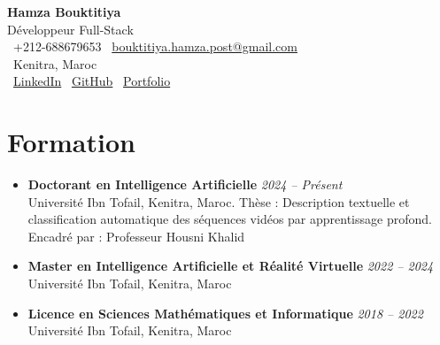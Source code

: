 \documentclass[10pt,a4paper]{article}
\newcommand{\cvheader}[4]{
    \begin{center}
        {\Huge\bfseries #1}\\[0.1em]
        {\large #2}\\[0.1em]
        \faPhone\ #3 \quad \faEnvelope\ \href{mailto:#4}{#4}\\[0.1em]
        \faMapMarker\ Kenitra, Maroc\\[0.1em]
        \faLinkedin\ \href{https://www.linkedin.com/in/hamza-bouktitiya-604471253/}{LinkedIn} \quad
        \faGithub\ \href{https://github.com/gothamza}{GitHub} \quad
        \faGlobe\ \href{https://gothamza.github.io/portfolio/}{Portfolio}
    \end{center}
    \vspace{-0.3em}
}
\newcommand{\cvitem}[2]{\textbf{#1} \hfill \textit{#2}}
\begin{document}
\cvheader{Hamza Bouktitiya}{Développeur Full-Stack}{+212-688679653}{bouktitiya.hamza.post@gmail.com}

\section*{Formation}
\begin{itemize}
    \item \cvitem{Doctorant en Intelligence Artificielle}{2024 -- Présent}\\
    Université Ibn Tofail, Kenitra, Maroc. Thèse : Description textuelle et classification automatique des séquences vidéos par apprentissage profond. Encadré par : Professeur Housni Khalid
    \item \cvitem{Master en Intelligence Artificielle et Réalité Virtuelle}{2022 -- 2024}\\
    Université Ibn Tofail, Kenitra, Maroc
    \item \cvitem{Licence en Sciences Mathématiques et Informatique}{2018 -- 2022}\\
    Université Ibn Tofail, Kenitra, Maroc
\end{itemize}
\end{document}
